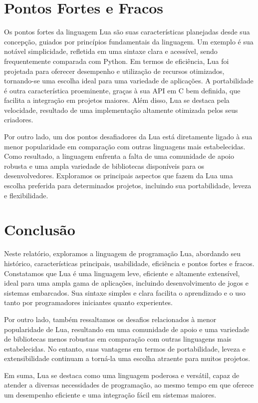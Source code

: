 \documentclass[12pt]{article}
\begin{document}
\section{Pontos Fortes e Fracos}
Os pontos fortes da linguagem Lua são suas características planejadas desde sua concepção, guiados por princípios fundamentais da linguagem. Um exemplo é sua notável simplicidade, refletida em uma sintaxe clara e acessível, sendo frequentemente comparada com Python. Em termos de eficiência, Lua foi projetada para oferecer desempenho e utilização de recursos otimizados, tornando-se uma escolha ideal para uma variedade de aplicações. A portabilidade é outra característica proeminente, graças à sua API em C bem definida, que facilita a integração em projetos maiores. Além disso, Lua se destaca pela velocidade, resultado de uma implementação altamente otimizada pelos seus criadores.
\cite{lua-edu}
\par
Por outro lado, um dos pontos desafiadores da Lua está diretamente ligado à sua menor popularidade em comparação com outras linguagens mais estabelecidas. Como resultado, a linguagem enfrenta a falta de uma comunidade de apoio robusta e uma ampla variedade de bibliotecas disponíveis para os desenvolvedores.
Exploramos os principais aspectos que fazem da Lua uma escolha preferida para determinados projetos, incluindo sua portabilidade, leveza e flexibilidade.

\section{Conclusão}
Neste relatório, exploramos a linguagem de programação Lua, abordando seu histórico, características principais, usabilidade, eficiência e pontos fortes e fracos. Constatamos que Lua é uma linguagem leve, eficiente e altamente extensível, ideal para uma ampla gama de aplicações, incluindo desenvolvimento de jogos e sistemas embarcados. Sua sintaxe simples e clara facilita o aprendizado e o uso tanto por programadores iniciantes quanto experientes.

Por outro lado, também ressaltamos os desafios relacionados à menor popularidade de Lua, resultando em uma comunidade de apoio e uma variedade de bibliotecas menos robustas em comparação com outras linguagens mais estabelecidas. No entanto, suas vantagens em termos de portabilidade, leveza e extensibilidade continuam a torná-la uma escolha atraente para muitos projetos.

Em suma, Lua se destaca como uma linguagem poderosa e versátil, capaz de atender a diversas necessidades de programação, ao mesmo tempo em que oferece um desempenho eficiente e uma integração fácil em sistemas maiores.
\end{document}
